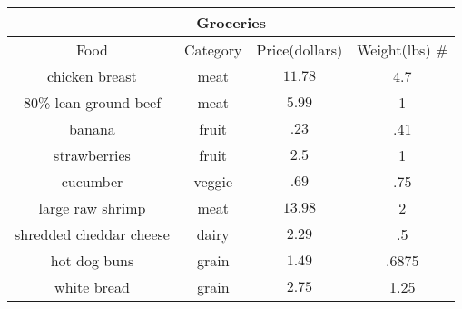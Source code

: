 \begin{tabular}{c|c|c|c}
    \hline
    \multicolumn{4}{|c|}{Groceries}                                      \\
    \hline
    Food                    & Category & Price(dollars) & Weight(lbs) \# \\
    \hline
    chicken breast          & meat     & $11.78$        & 4.7            \\
    80\% lean ground beef   & meat     & $5.99$         & 1              \\
    banana                  & fruit    & $.23$          & .41            \\
    strawberries            & fruit    & $2.5$          & 1              \\
    cucumber                & veggie   & $.69$          & .75            \\
    large raw shrimp        & meat     & $13.98$        & 2              \\
    shredded cheddar cheese & dairy    & $2.29$         & .5             \\
    hot dog buns            & grain    & $1.49$         & .6875          \\
    white bread             & grain    & $2.75$         & 1.25           \\
    \hline
\end{tabular}